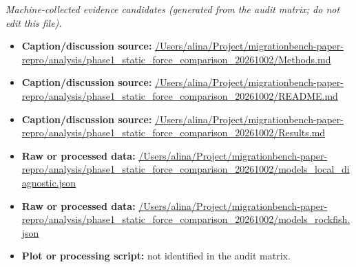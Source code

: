 \emph{Machine-collected evidence candidates (generated from the audit matrix; do not edit this file).}
\begin{itemize}[leftmargin=1.4em,noitemsep]
\item \textbf{Caption/discussion source:} \url{/Users/alina/Project/migrationbench-paper-repro/analysis/phase1_static_force_comparison_20261002/Methods.md}
\item \textbf{Caption/discussion source:} \url{/Users/alina/Project/migrationbench-paper-repro/analysis/phase1_static_force_comparison_20261002/README.md}
\item \textbf{Caption/discussion source:} \url{/Users/alina/Project/migrationbench-paper-repro/analysis/phase1_static_force_comparison_20261002/Results.md}
\item \textbf{Raw or processed data:} \url{/Users/alina/Project/migrationbench-paper-repro/analysis/phase1_static_force_comparison_20261002/models_local_diagnostic.json}
\item \textbf{Raw or processed data:} \url{/Users/alina/Project/migrationbench-paper-repro/analysis/phase1_static_force_comparison_20261002/models_rockfish.json}
\item \textbf{Plot or processing script:} not identified in the audit matrix.
\end{itemize}
